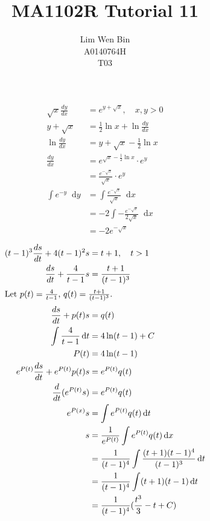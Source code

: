 \documentclass[12pt]{article}
\newcommand*\diff{\mathop{}\!\mathrm{d}}
\newenvironment{problem}[2][Problem]{\begin{trivlist}
\item[\hskip \labelsep {\bfseries #1}\hskip \labelsep {\bfseries #2.}]}{\end{trivlist}}
\begin{document}
\title{MA1102R Tutorial 11}
\author{Lim Wen Bin \\
A0140764H\\
T03}
\maketitle

\begin{problem}{1.b}
\end{problem}
\begin{align*}
\sqrt{x} \frac{dy}{dx} &= e^{y+\sqrt{x}}, \quad x, y > 0\\
y+\sqrt{x} &= \frac{1}{2}\ln x + \ln \frac{dy}{dx}\\
\ln \frac{dy}{dx}  &= y + \sqrt{x} - \frac{1}{2}\ln x\\
\frac{dy}{dx}  &= e^{\sqrt{x} - \frac{1}{2}\ln x } \cdot e^y\\
&= \frac{e^{- \sqrt{x}}}{\sqrt{x}} \cdot e^y\\
\int e^{-y} \diff y &= \int \frac{e^{- \sqrt{x}}}{\sqrt{x}} \diff x\\
&= -2\int -\frac{e^{- \sqrt{x}}}{2\sqrt{x}} \diff x\\
&= -2 e^{-\sqrt{x}}
\end{align*}
\filbreak

\begin{problem}{1.e}
\end{problem}
\begin{align*}
(t-1)^3\frac{ds}{dt} + 4(t-1)^2s &= t + 1, \quad t>1\\
\frac{ds}{dt} + \frac{4}{t-1}s &= \frac{t + 1}{(t-1)^3}\\
\intertext{Let $p(t) = \frac{4}{t-1}$, $q(t) = \frac{t+1}{(t-1)^3}$.}
\frac{ds}{dt} + p(t)s &= q(t)\\
\int \frac{4}{t-1} \diff t &= 4\ln(t-1) + C\\
P(t) &= 4\ln (t-1)\\
e^{P(t)}\frac{ds}{dt} + e^{P(t)}p(t)s &= e^{P(t)}q(t)\\
\frac{d}{dt}(e^{P(t)}s) &= e^{P(t)}q(t)\\
e^{P(x)}s &= \int e^{P(t)}q(t) \diff t\\
s &= \frac{1}{e^{P(t)}} \int e^{P(t)}q(t) \diff x\\
&= \frac{1}{(t-1)^4} \int \frac{(t+1)(t-1)^4}{(t-1)^3} \diff t\\
&= \frac{1}{(t-1)^4} \int (t+1)(t-1)\diff t\\
&= \frac{1}{(t-1)^4} (\frac{t^3}{3} - t + C)\\
\end{align*}
\filbreak
\end{document}
